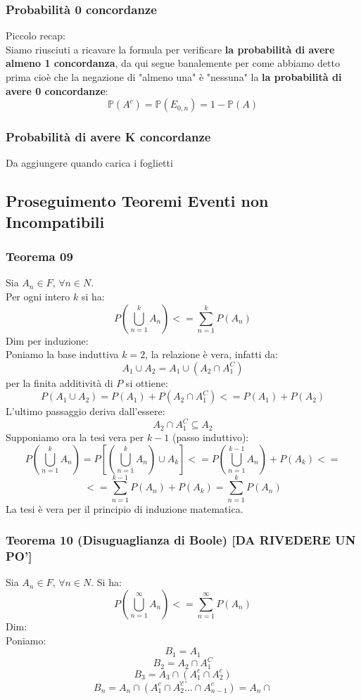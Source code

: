 \subsubsection{Probabilità 0 concordanze}
Piccolo recap:\\
Siamo riusciuti a ricavare la formula per verificare \textbf{la probabilità di avere almeno 1 concordanza}, da qui segue banalemente per come abbiamo detto prima cioè che la negazione di "almeno una" è "nessuna" la \textbf{la probabilità di avere 0 concordanze}:
$$ \mathbb{P}(A^c) = \mathbb{P}(E_{0,n}) = 1 - \mathbb{P}(A) $$

\subsubsection{Probabilità di avere K concordanze}
Da aggiungere quando carica i foglietti

\subsection{Proseguimento Teoremi Eventi non Incompatibili}
\subsubsection{Teorema 09}
Sia $A_n \in F$, $\forall n \in N$.\\
Per ogni intero $k$ si ha:
$$ P(\bigcup_{n=1}^k A_n) <= \sum_{n=1}^k P(A_n) $$
Dim per induzione:\\
Poniamo la base induttiva $k=2$, la relazione è vera, infatti da:
$$ A_1 \cup A_2 = A_1 \cup (A_2 \cap A_1^C) $$
per la finita additività di $P$ si ottiene:
$$ P(A_1 \cup A_2) = P(A_1) + P(A_2 \cap A_1^C) <= P(A_1) + P(A_2) $$
L'ultimo passaggio deriva dall'essere:
$$ A_2 \cap A_1^C \subseteq A_2 $$
Supponiamo ora la tesi vera per $k-1$ (passo induttivo):
$$ P(\bigcup_{n=1}^k A_n) = P[(\bigcup_{n=1}^k A_n) \cup A_k ] <= P(\bigcup_{n=1}^{k-1} A_n)+P(A_k) <= $$
$$ <= \sum_{n=1}^{k-1} P(A_n) + P(A_k) = \sum_{n=1}^k P(A_n)$$
La tesi è vera per il principio di induzione matematica.

\subsubsection{Teorema 10 (Disuguaglianza di Boole) [DA RIVEDERE UN PO']}
Sia $A_n \in F$, $\forall n \in N$. Si ha:
$$  P(\bigcup_{n=1}^{\infty} A_n) <= \sum_{n=1}^{\infty} P(A_n) $$
Dim:\\
Poniamo:
$$ B_1 = A_1 $$
$$ B_2 = A_2 \cap A_1^C $$
$$ B_3 = A_3 \cap (A_1^c \cap A_2^c) $$
$$ ... $$
$$ B_n = A_n \cap (A_1^c \cap A_2^c ... \cap A_{n-1}^c) = A_n \cap $$

